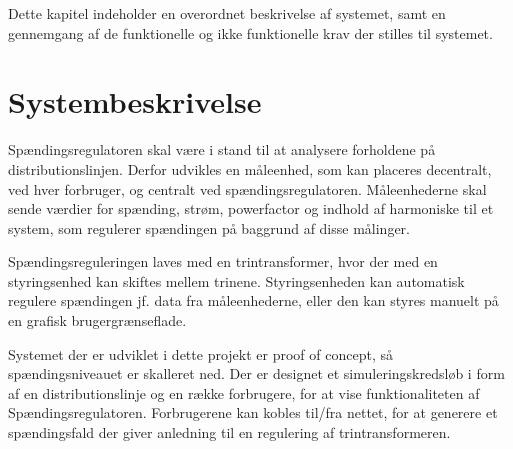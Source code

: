 
Dette kapitel indeholder en overordnet beskrivelse af systemet, samt en gennemgang af de funktionelle og ikke funktionelle krav der stilles til systemet. 

\section{Systembeskrivelse}
Spændingsregulatoren skal være i stand til at analysere forholdene på distributionslinjen. Derfor udvikles en måleenhed, som kan placeres decentralt, ved hver forbruger, og centralt ved spændingsregulatoren. Måleenhederne skal sende værdier for spænding, strøm, powerfactor og indhold af harmoniske til et system, som regulerer spændingen på baggrund af disse målinger. 

Spændingsreguleringen laves med en trintransformer, hvor der med en styringsenhed kan skiftes mellem trinene. Styringsenheden kan automatisk regulere spændingen jf. data fra måleenhederne, eller den kan styres manuelt på en grafisk brugergrænseflade. 

Systemet der er udviklet i dette projekt er proof of concept, så spændingsniveauet er skalleret ned.  Der er designet et simuleringskredsløb i form af en distributionslinje og en række forbrugere, for at vise funktionaliteten af Spændingsregulatoren. Forbrugerene  kan kobles til/fra nettet, for at generere et spændingsfald der giver anledning til en regulering af trintransformeren. 

